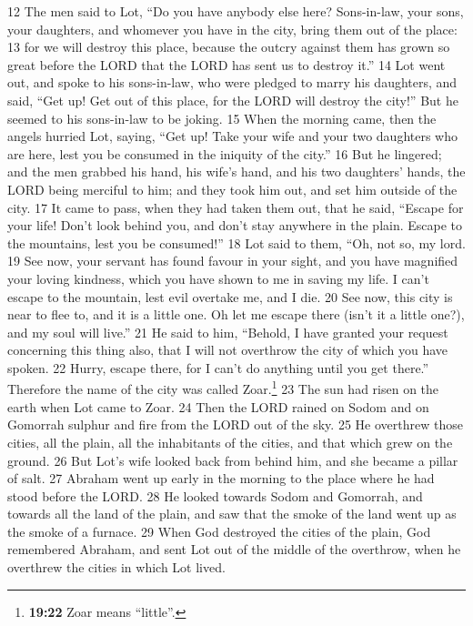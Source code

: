 {12} The men said to Lot, ``Do you have anybody else here? Sons-in-law,
your sons, your daughters, and whomever you have in the city, bring them
out of the place: {13} for we will destroy this place, because the
outcry against them has grown so great before the LORD that the LORD has
sent us to destroy it.'' {14} Lot went out, and spoke to his
sons-in-law, who were pledged to marry his daughters, and said, ``Get
up! Get out of this place, for the LORD will destroy the city!'' But he
seemed to his sons-in-law to be joking. {15} When the morning came, then
the angels hurried Lot, saying, ``Get up! Take your wife and your two
daughters who are here, lest you be consumed in the iniquity of the
city.'' {16} But he lingered; and the men grabbed his hand, his wife's
hand, and his two daughters' hands, the LORD being merciful to him; and
they took him out, and set him outside of the city. {17} It came to
pass, when they had taken them out, that he said, ``Escape for your
life! Don't look behind you, and don't stay anywhere in the plain.
Escape to the mountains, lest you be consumed!'' {18} Lot said to them,
``Oh, not so, my lord. {19} See now, your servant has found favour in
your sight, and you have magnified your loving kindness, which you have
shown to me in saving my life. I can't escape to the mountain, lest evil
overtake me, and I die. {20} See now, this city is near to flee to, and
it is a little one. Oh let me escape there (isn't it a little one?), and
my soul will live.'' {21} He said to him, ``Behold, I have granted your
request concerning this thing also, that I will not overthrow the city
of which you have spoken. {22} Hurry, escape there, for I can't do
anything until you get there.'' Therefore the name of the city was
called Zoar.\footnote{\textbf{19:22} Zoar means ``little''.} {23} The
sun had risen on the earth when Lot came to Zoar. {24} Then the LORD
rained on Sodom and on Gomorrah sulphur and fire from the LORD out of
the sky. {25} He overthrew those cities, all the plain, all the
inhabitants of the cities, and that which grew on the ground. {26} But
Lot's wife looked back from behind him, and she became a pillar of salt.
{27} Abraham went up early in the morning to the place where he had
stood before the LORD. {28} He looked towards Sodom and Gomorrah, and
towards all the land of the plain, and saw that the smoke of the land
went up as the smoke of a furnace. {29} When God destroyed the cities of
the plain, God remembered Abraham, and sent Lot out of the middle of the
overthrow, when he overthrew the cities in which Lot lived.

